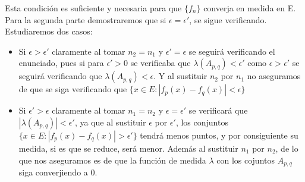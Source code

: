 \documentclass{article}
\begin{document}
Esta condición es suficiente y necesaria para que $\{f_n\}$ converja en medida en E. \\

Para la segunda parte demostraremos que si $\epsilon = \epsilon'$, se sigue verificando. Estudiaremos dos casos: 

\begin{itemize}
\item Si $\epsilon > \epsilon'$ claramente al tomar $n_2 = n_1$ y $\epsilon' = \epsilon$ se seguirá verificando el enunciado, pues si para $\epsilon' > 0$ se verificaba que $\lambda(A_{p,q}) < \epsilon'$ como $\epsilon > \epsilon'$ se seguirá verificando que $\lambda(A_{p,q}) < \epsilon$. Y al sustituir $n_2$ por $n_1$ no aseguramos de que se siga verificando que $\{x \in E: |f_p(x) - f_q(x)| < \epsilon \}$

\item Si $\epsilon' > \epsilon$ claramente al tomar $n_1 = n_2$ y $\epsilon = \epsilon'$ se verificará que $|\lambda(A_{p,q})| < \epsilon'$, ya que al sustituir $\epsilon$ por $\epsilon'$, los conjuntos $\{x \in E: |f_p(x) - f_q(x)| > \epsilon'\}$ tendrá menos puntos, y por consiguiente su medida, si es que se reduce, será menor. Además al sustituir $n_1$ por $n_2$, de lo que nos aseguramos es de que la función de medida $\lambda$ con los cojuntos $A_{p,q}$ siga converjiendo a 0.
\end{itemize}
\end{document}
